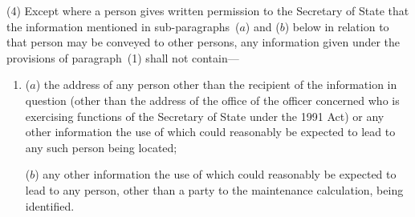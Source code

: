 \documentclass[12pt,a4paper]{article}
\begin{document}
(4) Except where a person gives written permission to the 
Secretary of State  %
that the information mentioned in sub-paragraphs~($a$)  and ($b$)  below in relation to that person may be conveyed to other persons, any information given under the provisions of paragraph~(1) shall not contain—
\begin{enumerate}\item[]
($a$) the address of any person other than the recipient of the information in question (other than the address of the office of the officer concerned who is exercising functions of the 
Secretary of State  %
under the 1991 Act) or any other information the use of which could reasonably be expected to lead to any such person being located;

($b$) any other information the use of which could reasonably be expected to lead to any person, other than a party to the maintenance calculation, being identified.
\end{enumerate}


%
%
%
%
%
%
\end{document}

